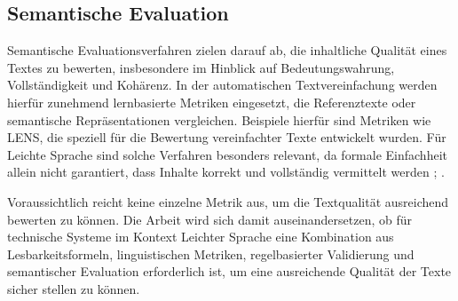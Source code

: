 \subsection{Semantische Evaluation}
Semantische Evaluationsverfahren zielen darauf ab, die inhaltliche Qualität eines Textes zu bewerten, insbesondere im Hinblick auf Bedeutungswahrung, Vollständigkeit und Kohärenz.
In der automatischen Textvereinfachung werden hierfür zunehmend lernbasierte Metriken eingesetzt, die Referenztexte oder semantische Repräsentationen vergleichen.
Beispiele hierfür sind Metriken wie LENS, die speziell für die Bewertung vereinfachter Texte entwickelt wurden.
Für Leichte Sprache sind solche Verfahren besonders relevant, da formale Einfachheit allein nicht garantiert, dass Inhalte korrekt und vollständig vermittelt werden \cite[S. 133-136]{alva-manchego_data-driven_2020}; \cite{maddela_lens_2023}.

Voraussichtlich reicht keine einzelne Metrik aus, um die Textqualität ausreichend bewerten zu können.
Die Arbeit wird sich damit auseinandersetzen, ob für technische Systeme im Kontext Leichter Sprache eine Kombination aus Lesbarkeitsformeln, linguistischen Metriken, regelbasierter Validierung und semantischer Evaluation erforderlich ist, um eine ausreichende Qualität der Texte sicher stellen zu können.

